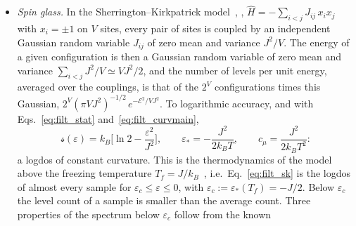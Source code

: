 \documentclass[10pt,a4paper]{article}
\theoremstyle{plain}
\newcommand{\Var}{\operatorname{Var}}
\newcommand{\lndos}{{logdos}}  %
\newcommand{\enrg}{\mathcal{E}}  %
\newcommand{\lds}{\mathscr{s}}  %
\begin{document}
\begin{itemize}
  If the two-level systems are pairs of spins $\tfrac12$ (moment $m_0$ each)
  with a singlet ground state and a triplet at $\Delta$, the susceptibility
  of one pair is, by Eq.~\eqref{eq:filt_mb_response},
  $\Var(\hat M)/k_BT=8m_0^{2}/k_BT\,(e^{\Delta/k_BT}+3)$: a Curie law for
  $\Delta\ll k_BT$, and exponentially small for $\Delta\gg k_BT$. Hence
  \[
    \chi=\int_0^{\infty}d\Delta\,P(\Delta)\,\frac{8m_0^{2}}{k_BT\,(e^{\Delta/k_BT}+3)}
    \;\propto\;T^{\theta-1} :
  \]
  the number of pairs with $\Delta<k_BT$, which respond as free moments, is
  $\propto T^{\theta}$, and each contributes a Curie term $\propto1/T$. The
  susceptibility diverges for $\theta<1$. The exponent $\theta$ is not
  universal and varies continuously with the parameters of the Hamiltonian
  (random-singlet and Griffiths phases\footnote{Phases of disordered
  magnets in which rare, weakly coupled spins or regions dominate the
  response at low temperature.}~\cite{BhattLee1982,Griffiths1969}): power
  laws without a critical point and without universality.
\item \emph{Spin glass.} In the Sherrington--Kirkpatrick
  model~\cite{SherringtonKirkpatrick1975}, \cite[Sec.~13.4.3]{Plischke},
  $\hat H=-\sum_{i<j}J_{ij}\,x_ix_j$ with $x_i=\pm1$ on $V$ sites, every pair
  of sites is coupled by an independent Gaussian random variable $J_{ij}$ of
  zero mean and variance $J^{2}/V$. The energy of a given configuration is
  then a Gaussian random variable of zero mean and variance
  $\sum_{i<j}J^{2}/V\simeq VJ^{2}/2$, and the number of levels per unit
  energy, averaged over the couplings, is that of the $2^{V}$ configurations
  times this Gaussian, $2^{V}(\pi VJ^{2})^{-1/2}\,e^{-\enrg^{2}/VJ^{2}}$. To
  logarithmic accuracy, and with Eqs.~\eqref{eq:filt_stat}
  and~\eqref{eq:filt_curvmain},
  \begin{equation}\label{eq:filt_sk}
    \lds(\varepsilon)=k_B\Big[\ln2-\frac{\varepsilon^{2}}{J^{2}}\Big] ,
    \qquad
    \varepsilon_*=-\frac{J^{2}}{2k_BT} ,\qquad
    c_\mu=\frac{J^{2}}{2k_BT^{2}} :
  \end{equation}
  a \lndos{} of constant curvature. This is the thermodynamics of the model
  above the freezing temperature
  $T_f=J/k_B$~\cite{SherringtonKirkpatrick1975}, i.e.\ Eq.~\eqref{eq:filt_sk}
  is the \lndos{} of almost every sample for
  $\varepsilon_c\le\varepsilon\le0$, with
  $\varepsilon_c:=\varepsilon_*(T_f)=-J/2$. Below $\varepsilon_c$ the level
  count of a sample is smaller than the average count. Three
  properties of the spectrum below $\varepsilon_c$ follow from the known

\end{itemize}
\end{document}
